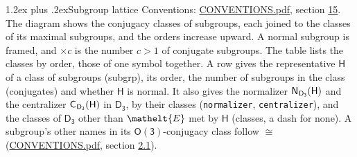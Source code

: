 \documentclass[10pt,a4paper]{article}
\makeatletter
\renewcommand\section{\@startsection{section}{1}{\z@}{-3ex plus -1ex minus -.2ex}%
  {1.2ex plus .2ex}{\normalfont\large\sffamily\bfseries\color{parttitle}}}
\numberwithin{equation}{section}
\newcommand{\eltfont}[1]{{\let\sigma\eltsigma\mathelt{#1}}}
\newcommand{\grp}[1]{\mathsf{#1}}
\newcommand{\cls}[1]{\eltfont{#1}}
\newcommand{\samecls}{\cong}
\newcommand{\nconj}[1]{{\scriptsize$\times#1$}}
\newcommand{\hairsp}{\mkern1mu}
\makeatother
\begin{document}
\section{Subgroup lattice}\label{s:subgroups}
Conventions: \href{../../CONVENTIONS.pdf}{CONVENTIONS.pdf}, section \href{../../CONVENTIONS.pdf\#conv.15}{15}.
The diagram shows the conjugacy classes of subgroups, each joined to the classes of its maximal subgroups, and the orders increase upward. A normal subgroup is framed, and ${\times}c$ is the number $c > 1$ of conjugate subgroups. The table lists the classes by order, those of one symbol together. \label{n:group.H}\label{n:head.subgroup}\label{n:head.order}\label{n:head.conjugates}\label{n:head.normal}A row gives the representative $\grp{H}$ of a class of subgroups (subgrp), its order, the number of subgroups in the class (conjugates) and whether $\grp{H}$ is normal. \label{n:group.normalizer}\label{n:group.centralizer}\label{n:head.classes}It also gives the normalizer $\grp{N}_{\hairsp \grp{D_{3}}}(\grp{H})$ and the centralizer $\grp{C}_{\hairsp \grp{D_{3}}}(\grp{H})$ in $\grp{D_{3}}$, by their classes (\texttt{normalizer}, \texttt{centralizer}), and the classes of $\grp{D_{3}}$ other than $\cls{E}$ met by $\grp{H}$ (classes, a dash for none). A subgroup's other names in its \href{O3.pdf}{$\grp{O(3)}$}-conjugacy class follow $\samecls$ (\href{../../CONVENTIONS.pdf}{CONVENTIONS.pdf}, section \href{../../CONVENTIONS.pdf\#conv.2.1}{2.1}).
\begin{center}
\end{center}
\end{document}
